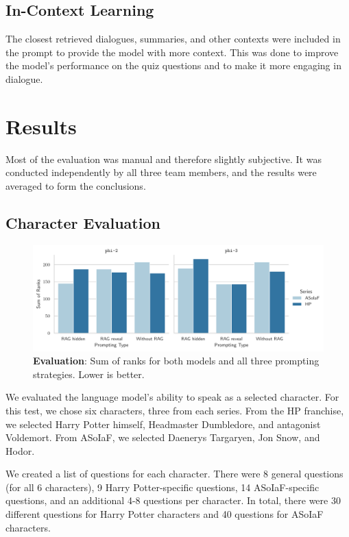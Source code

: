 \documentclass[fleqn,moreauthors,10pt]{ds_report}
\begin{document}
\subsection*{In-Context Learning}

The closest retrieved dialogues, summaries, and other contexts were included in the prompt to provide the model with more context. This was done to improve the model's performance on the quiz questions and to make it more engaging in dialogue.


\section*{Results}

Most of the evaluation was manual and therefore slightly subjective. It was conducted independently by all three team members, and the results were averaged to form the conclusions.

\subsection*{Character Evaluation}

\begin{figure}[hbt]
	\centering
	\includegraphics[width=0.8\linewidth]{questioners-results.pdf}
	\caption{\textbf{Evaluation}: Sum of ranks for both models and all three prompting strategies. Lower is better.}
	\label{fig:character_evaluation_results}
\end{figure}

We evaluated the language model's ability to speak as a selected character. For this test, we chose six characters, three from each series. From the HP franchise, we selected Harry Potter himself, Headmaster Dumbledore, and antagonist Voldemort. From ASoIaF, we selected Daenerys Targaryen, Jon Snow, and Hodor.

We created a list of questions for each character. There were 8 general questions (for all 6 characters), 9 Harry Potter-specific questions, 14 ASoIaF-specific questions, and an additional 4-8 questions per character. In total, there were 30 different questions for Harry Potter characters and 40 questions for ASoIaF characters.
\end{document}

